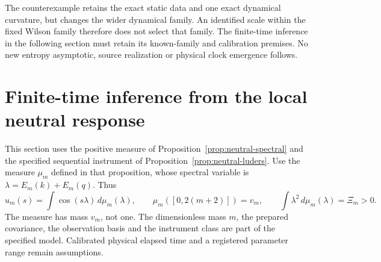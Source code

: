 \documentclass[11pt]{article}
\theoremstyle{definition}
\begin{document}
The counterexample retains the exact static data and one exact dynamical
curvature, but changes the wider dynamical family. An identified scale within
the fixed Wilson family therefore does not select that family. The finite-time
inference in the following section must retain its known-family and calibration
premises. No new entropy asymptotic, source realization or physical clock
emergence follows.


\section{Finite-time inference from the local neutral response}
\label{app:neutral-inference}

This section uses the positive measure of
Proposition~\ref{prop:neutral-spectral} and the specified sequential
instrument of Proposition~\ref{prop:neutral-luders}. Use the measure $\mu_m$ defined in that proposition, whose spectral
variable is $\lambda=E_m(k)+E_m(q)$. Thus
\[
 u_m(s)=\int\cos(s\lambda)\,d\mu_m(\lambda),\qquad
 \mu_m([0,2(m+2)])=v_m,\qquad
 \int\lambda^2\,d\mu_m(\lambda)=\Xi_m>0.
\]
The measure has mass $v_m$, not one. The dimensionless mass $m$, the
prepared covariance, the observation basis and the instrument class are
part of the specified model. Calibrated physical elapsed time and a
registered parameter range remain assumptions.
\end{document}
